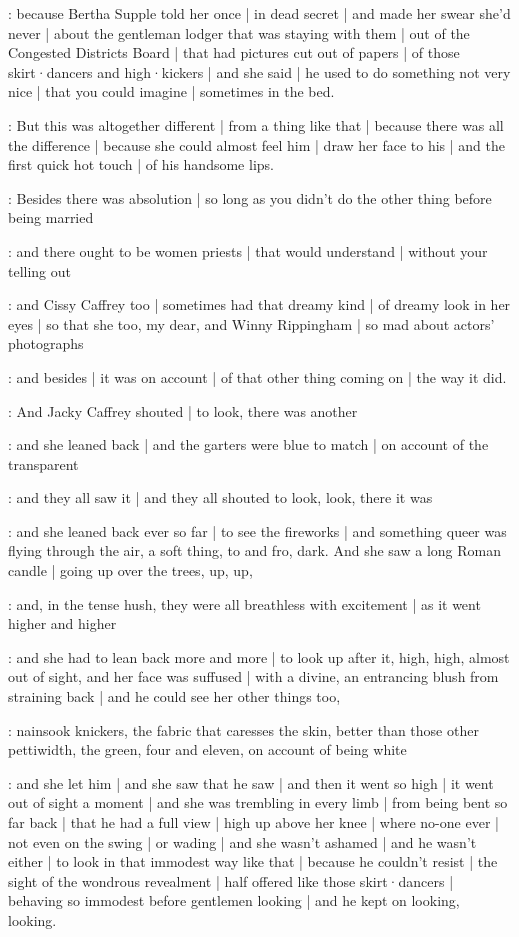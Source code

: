 \gertyJudgy:
because Bertha Supple told her once |
in dead secret |
and made her swear she'd never |
about the gentleman lodger that was staying with them |
out of the Congested Districts Board |
that had pictures cut out of papers |
of those skirt·dancers and high·kickers |
and she said |
he used to do something not very nice |
that you could imagine |
sometimes in the bed.

\gertySex:
But this was altogether different |
from a thing like that |
because there was all the difference |
because she could almost feel him |
draw her face to his |
and the first quick hot touch |
of his handsome lips.

\gertyJudgy:
Besides there was absolution |
so long as you didn't do the other thing before being married

\gertyReal:
and there ought to be women priests |%
that would understand |
without your telling out

\gertyNovel:
and Cissy Caffrey too |
sometimes had that dreamy kind |
of dreamy look in her eyes |
so that she too,
my dear,
and Winny Rippingham |
so mad about actors' photographs

\gertyReal:
and besides |
it was on account |
of that other thing coming on |
the way it did.

:
And Jacky Caffrey shouted |
to look,
there was another

\gertySex:
and she leaned back |
and the garters were blue to match |
on account of the transparent

:
and they all saw it |
and they all shouted to look,
look,
there it was

\gertySex:
and she leaned back ever so far |
to see the fireworks |
and something queer was flying through the air,
a soft thing,
to and fro,
dark.
And she saw a long Roman candle |
going up over the trees,%
up,
up,

:
and,
in the tense hush,
they were all breathless with excitement |
as it went higher and higher

\gertySex:
and she had to lean back more and more |
to look up after it,
high,
high,
almost out of sight,
and her face was suffused |
with a divine,
an entrancing blush from straining back |
and he could see her other things too,

\gertyReal:
nainsook knickers,
the fabric that caresses the skin,
better than those other pettiwidth,
the green,
four and eleven,
on account of being white

\gertySex:
and she let him |
and she saw that he saw |
and then it went so high |
it went out of sight a moment |
and she was trembling in every limb |
from being bent so far back |
that he had a full view |
high up above her knee |
where no-one ever |
not even on the swing |
or wading |
and she wasn't ashamed |
and he wasn't either |%
to look in that immodest way like that |
because he couldn't resist |
the sight of the wondrous revealment |
half offered like those skirt·dancers |
behaving so immodest before gentlemen looking |
and he kept on looking,
looking.

